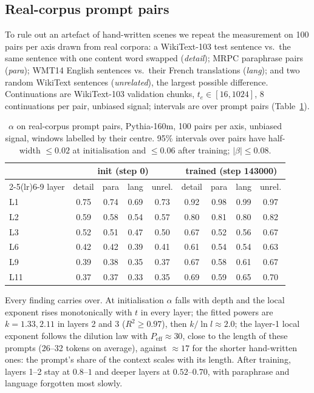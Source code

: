 \documentclass[11pt]{article}
\theoremstyle{definition}
\theoremstyle{remark}
\begin{document}
\subsection{Real-corpus prompt pairs}
\label{sec:results-real}

To rule out an artefact of hand-written scenes we repeat the measurement on 100 pairs per axis drawn from real corpora: a WikiText-103 test sentence vs.\ the same sentence with one content word swapped (\emph{detail}); MRPC paraphrase pairs (\emph{para}); WMT14 English sentences vs.\ their French translations (\emph{lang}); and two random WikiText sentences (\emph{unrelated}), the largest possible difference. Continuations are WikiText-103 validation chunks, $t_e\in[16,1024]$, 8 continuations per pair, unbiased signal; intervals are over prompt pairs (Table~\ref{tab:real}).

\begin{table}[t]
\centering\small
\begin{tabular}{lcccccccc}
\toprule
 & \multicolumn{4}{c}{init (step 0)} & \multicolumn{4}{c}{trained (step 143000)} \\
\cmidrule(lr){2-5}\cmidrule(lr){6-9}
layer & detail & para & lang & unrel. & detail & para & lang & unrel. \\
\midrule
L1  & 0.75 & 0.74 & 0.69 & 0.73 & 0.92 & 0.98 & 0.99 & 0.97 \\
L2  & 0.59 & 0.58 & 0.54 & 0.57 & 0.80 & 0.81 & 0.80 & 0.82 \\
L3  & 0.52 & 0.51 & 0.47 & 0.50 & 0.67 & 0.52 & 0.56 & 0.67 \\
L6  & 0.42 & 0.42 & 0.39 & 0.41 & 0.61 & 0.54 & 0.54 & 0.63 \\
L9  & 0.39 & 0.38 & 0.35 & 0.37 & 0.67 & 0.58 & 0.61 & 0.67 \\
L11 & 0.37 & 0.37 & 0.33 & 0.35 & 0.69 & 0.59 & 0.65 & 0.70 \\
\bottomrule
\end{tabular}
\caption{$\alpha$ on real-corpus prompt pairs, Pythia-160m, 100 pairs per axis, unbiased signal, windows labelled by their centre. 95\% intervals over pairs have half-width $\le0.02$ at initialisation and $\le0.06$ after training; $|\beta|\le0.08$.}
\label{tab:real}
\end{table}

Every finding carries over. At initialisation $\alpha$ falls with depth and the local exponent rises monotonically with $t$ in every layer; the fitted powers are $k=1.33, 2.11$ in layers 2 and 3 ($R^2\ge0.97$), then $k/\ln l\approx2.0$; the layer-1 local exponent follows the dilution law with $P_{\mathrm{eff}}\approx30$, close to the length of these prompts (26--32 tokens on average), against $\approx17$ for the shorter hand-written ones: the prompt's share of the context scales with its length. After training, layers 1--2 stay at $0.8$--$1$ and deeper layers at $0.52$--$0.70$, with paraphrase and language forgotten most slowly.
\end{document}
